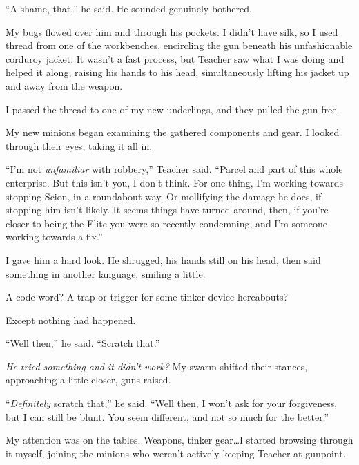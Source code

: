 ``A shame, that,'' he said.  He sounded genuinely bothered.



My bugs flowed over him and through his pockets.  I didn't have silk, so I used thread from one of the workbenches, encircling the gun beneath his unfashionable corduroy jacket.  It wasn't a fast process, but Teacher saw what I was doing and helped it along, raising his hands to his head, simultaneously lifting his jacket up and away from the weapon.



I passed the thread to one of my new underlings, and they pulled the gun free.



My new minions began examining the gathered components and gear.  I looked through their eyes, taking it all in.



``I'm not \emph{unfamiliar} with robbery,'' Teacher said.  ``Parcel and part of this whole enterprise.  But this isn't you, I don't think.  For one thing, I'm working towards stopping Scion, in a roundabout way.  Or mollifying the damage he does, if stopping him isn't likely.  It seems things have turned around, then, if you're closer to being the Elite you were so recently condemning, and I'm someone working towards a fix.''



I gave him a hard look.  He shrugged, his hands still on his head, then said something in another language, smiling a little.



A code word?  A trap or trigger for some tinker device hereabouts?



Except nothing had happened.



``Well then,'' he said.  ``Scratch that.''



\emph{He tried something and it didn't work?  }My swarm shifted their stances, approaching a little closer, guns raised.



``\emph{Definitely} scratch that,'' he said.  ``Well then, I won't ask for your forgiveness, but I can still be blunt.  You seem different, and not so much for the better.''



My attention was on the tables.  Weapons, tinker gear\ldots I started browsing through it myself, joining the minions who weren't actively keeping Teacher at gunpoint.



